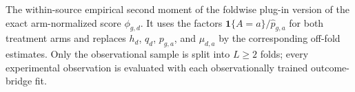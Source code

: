 The within-source empirical second moment of the foldwise plug-in version of the exact arm-normalized score \(\phi_{g,d}\).  It uses the factors \(\mathbf 1\{A=a\}/\widehat p_{g,a}\) for both treatment arms and replaces \(h_d\), \(q_d\), \(p_{g,a}\), and \(\mu_{d,a}\) by the corresponding off-fold estimates.  Only the observational sample is split into \(L\ge2\) folds; every experimental observation is evaluated with each observationally trained outcome-bridge fit.